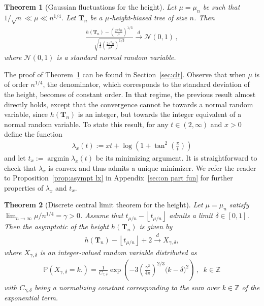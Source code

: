\documentclass{article}
\DeclareMathOperator*{\argmin}{argmin}
\newcommand{\pr}{\mathbb{P}}								%
\newcommand{\Prob}[1]{\pr\left(#1\right)}					%
\newcommand{\1}{\mathbbm{1}}								%
\newtheorem{theorem}{Theorem}[section]
\theoremstyle{definition}
\numberwithin{equation}{section}
\newcommand{\Z}{\mathbb Z}
\newcommand{\toindis}{\overset d\longrightarrow}
\newcommand{\floor}[1]{\left\lfloor #1\right\rfloor}
\begin{document}
\begin{theorem}[Gaussian fluctuations for the height]\label{thm:inter clt}
    Let $\mu=\mu_n$ be such that $1/\sqrt{n}\ll\mu\ll n^{1/4}$.
    Let $\mathbf{T}_n$ be a $\mu$-height-biased tree of size $n$.
    Then
    \begin{align*}
        \frac{h(\mathbf{T}_n)-\left(\frac{2\pi^2n}{\mu}\right)^{1/3}}{\sqrt{\frac{1}{3}\left(\frac{2\pi^2n}{\mu^4}\right)^{1/3}}}\toindis\mathcal{N}(0,1)\,,
    \end{align*}
    where $\mathcal{N}(0,1)$ is a standard normal random variable.
\end{theorem}

The proof of Theorem~\ref{thm:inter clt} can be found in Section~\ref{sec:clt}.
Observe that when $\mu$ is of order $n^{1/4}$, the denominator, which corresponds to the standard deviation of the height, becomes of constant order.
In that regime, the previous result almost directly holds, except that the convergence cannot be towards a normal random variable, since $h(\mathbf{T}_n)$ is an integer, but towards the integer equivalent of a normal random variable. To state this result, for any $t \in (2,\infty)$ and $x>0$ define the function
\begin{align}
    \lambda_x(t):=xt+\log\left(1+\tan^2 \left(\frac{\pi}{t}\right) \right)\label{eq:func_lambdax_minvalue}
\end{align}
and let $t_x:= \argmin\lambda_{x}(t)$ be its minimizing argument.
It is straightforward to check that $\lambda_x$ is convex and thus admits a unique minimizer. We refer the reader to Proposition~\ref{prop:asympt lx} in Appendix~\ref{sec:on part fun} for further properties of $\lambda_x$ and $t_x$.

\begin{theorem}[Discrete central limit theorem for the height]\label{thm:discrete clt}
    Let $\mu=\mu_n$ satisfy $\lim_{n\rightarrow\infty}\mu/n^{1/4}=\gamma>0$. Assume that $t_{\mu/n}-\floor{t_{\mu/n}}$ admits a limit $\delta\in[0,1]$.
    Then the asymptotic of the height $h(\mathbf{T}_n)$ is given by
    \begin{align*}
        h(\mathbf{T}_n)-\floor{t_{\mu/n}}+2\toindis X_{\gamma,\delta},
    \end{align*}
    where $X_{\gamma,\delta}$ is an integer-valued random variable distributed as
    \begin{align*}
        \Prob{X_{\gamma,\delta}=k\big.}=\frac{1}{C_{\gamma,\delta}}\exp\left(-3\left(\frac{\gamma^2}{4\pi}\right)^{2/3}\big(k-\delta\big)^2\right)\,,\;\;k\in \Z
    \end{align*}
    with $C_{\gamma,\delta}$ being a normalizing constant corresponding to the sum over $k\in\Z$ of the exponential term.
\end{theorem}
\end{document}
